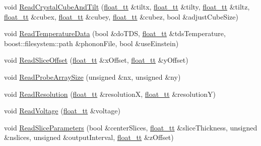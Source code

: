 \begin{DoxyCompactItemize}
\item 
void \hyperlink{class_q_s_t_e_m_1_1_c_qsc_reader_a91cd548461696a863bc2beb62cc2fd60}{Read\-Crystal\-Cube\-And\-Tilt} (\hyperlink{namespace_q_s_t_e_m_a915d7caa497280d9f927c4ce8d330e47}{float\-\_\-tt} \&tiltx, \hyperlink{namespace_q_s_t_e_m_a915d7caa497280d9f927c4ce8d330e47}{float\-\_\-tt} \&tilty, \hyperlink{namespace_q_s_t_e_m_a915d7caa497280d9f927c4ce8d330e47}{float\-\_\-tt} \&tiltz, \hyperlink{namespace_q_s_t_e_m_a915d7caa497280d9f927c4ce8d330e47}{float\-\_\-tt} \&cubex, \hyperlink{namespace_q_s_t_e_m_a915d7caa497280d9f927c4ce8d330e47}{float\-\_\-tt} \&cubey, \hyperlink{namespace_q_s_t_e_m_a915d7caa497280d9f927c4ce8d330e47}{float\-\_\-tt} \&cubez, bool \&adjust\-Cube\-Size)
\item 
void \hyperlink{class_q_s_t_e_m_1_1_c_qsc_reader_a24f9663652a3073fb1a868dd2283f524}{Read\-Temperature\-Data} (bool \&do\-T\-D\-S, \hyperlink{namespace_q_s_t_e_m_a915d7caa497280d9f927c4ce8d330e47}{float\-\_\-tt} \&tds\-Temperature, boost\-::filesystem\-::path \&phonon\-File, bool \&use\-Einstein)
\item 
void \hyperlink{class_q_s_t_e_m_1_1_c_qsc_reader_a1231326a7921d5c693d64583579d3c30}{Read\-Slice\-Offset} (\hyperlink{namespace_q_s_t_e_m_a915d7caa497280d9f927c4ce8d330e47}{float\-\_\-tt} \&x\-Offset, \hyperlink{namespace_q_s_t_e_m_a915d7caa497280d9f927c4ce8d330e47}{float\-\_\-tt} \&y\-Offset)
\item 
void \hyperlink{class_q_s_t_e_m_1_1_c_qsc_reader_ae64a81adacbc48788478d736a956e7f4}{Read\-Probe\-Array\-Size} (unsigned \&nx, unsigned \&ny)
\item 
void \hyperlink{class_q_s_t_e_m_1_1_c_qsc_reader_a6288bc50c1ff3a23bd0f694ef224ed5c}{Read\-Resolution} (\hyperlink{namespace_q_s_t_e_m_a915d7caa497280d9f927c4ce8d330e47}{float\-\_\-tt} \&resolution\-X, \hyperlink{namespace_q_s_t_e_m_a915d7caa497280d9f927c4ce8d330e47}{float\-\_\-tt} \&resolution\-Y)
\item 
void \hyperlink{class_q_s_t_e_m_1_1_c_qsc_reader_a03054f8fdac8f9f7260b545b2a56be77}{Read\-Voltage} (\hyperlink{namespace_q_s_t_e_m_a915d7caa497280d9f927c4ce8d330e47}{float\-\_\-tt} \&voltage)
\item 
void \hyperlink{class_q_s_t_e_m_1_1_c_qsc_reader_a4fbc9045d52f49eba75059244e6a8751}{Read\-Slice\-Parameters} (bool \&center\-Slices, \hyperlink{namespace_q_s_t_e_m_a915d7caa497280d9f927c4ce8d330e47}{float\-\_\-tt} \&slice\-Thickness, unsigned \&nslices, unsigned \&output\-Interval, \hyperlink{namespace_q_s_t_e_m_a915d7caa497280d9f927c4ce8d330e47}{float\-\_\-tt} \&z\-Offset)

\end{DoxyCompactItemize}

